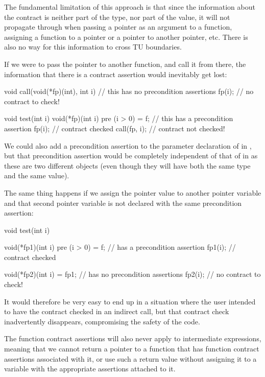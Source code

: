 The fundamental limitation of this approach is that since the information about the contract is neither part of the type, nor part of the value, it will not propagate through when passing a pointer as an argument to a function, assigning a function to a pointer or a pointer to another pointer, etc. There is also no way for this information to cross TU boundaries.

If we were to pass the pointer  to another function, and call it from there, the information that there is a contract assertion would inevitably get lost:
\begin{codeblock}
void call(void(*fp)(int), int i) {    // this  has no precondition assertions
  fp(i);       // no contract to check!
}

void test(int i) {
  void(*fp)(int i) pre (i > 0) = f;   // this  has a precondition assertion
  fp(i);       // contract  checked
  call(fp, i); // contract  not checked!
}
\end{codeblock}
We could also add a precondition assertion to the parameter declaration of  in , but that precondition assertion would be completely independent of that of  in  as these are two different objects (even though they will have both the same type and the same value).

The same thing happens if we assign the pointer value to another pointer variable and that second pointer variable is not declared with the same precondition assertion:
\begin{codeblock}
void test(int i) {
  void(*fp1)(int i) pre (i > 0) = f;   //  has a precondition assertion
  fp1(i);   // contract  checked
  
  void(*fp2)(int i) = fp1;             //  has no precondition assertions
  fp2(i);  // no contract to check!
}
\end{codeblock}
It would therefore be very easy to end up in a situation where the user intended to have the contract checked in an indirect call, but that contract check inadvertently disappears, compromising the safety of the code.

The function contract assertions will also never apply to intermediate expressions, meaning that we cannot return a pointer to a function that has function contract assertions associated with it, or use such a return value without assigning it to a variable with the appropriate assertions attached to it.

